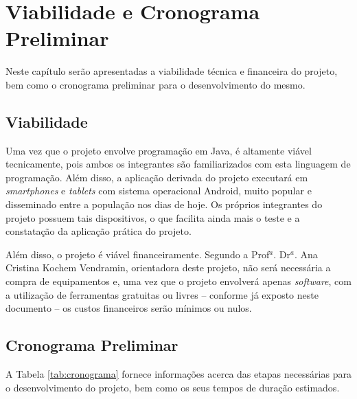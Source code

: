 \chapter{Viabilidade e Cronograma Preliminar}\label{cap:viabilidade}

Neste capítulo serão apresentadas a viabilidade técnica e financeira do projeto, bem como o cronograma preliminar para o desenvolvimento do mesmo.

\section{Viabilidade}\label{s:viabilidade}

Uma vez que o projeto envolve programação em Java, é altamente viável tecnicamente, pois ambos os integrantes são familiarizados com esta linguagem de programação. Além disso, a aplicação derivada do projeto executará em \textit{smartphones} e \textit{tablets} com sistema operacional Android, muito popular e disseminado entre a população nos dias de hoje. Os próprios integrantes do projeto possuem tais dispositivos, o que facilita ainda mais o teste e a constatação da aplicação prática do projeto.

Além disso, o projeto é viável financeiramente. Segundo a Prof$^a$. Dr$^a$. Ana Cristina Kochem Vendramin, orientadora deste projeto, não será necessária a compra de equipamentos e, uma vez que o projeto envolverá apenas \textit{software}, com a utilização de ferramentas gratuitas ou livres -- conforme já exposto neste documento -- os custos financeiros serão mínimos ou nulos.

\newpage

\section{Cronograma Preliminar}\label{s:cronograma}

A Tabela \ref{tab:cronograma} fornece informações acerca das etapas necessárias para o desenvolvimento do projeto, bem como os seus tempos de duração estimados.


